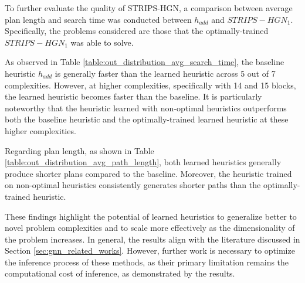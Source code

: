 

To further evaluate the quality of STRIPS-HGN, a comparison between average plan length and search time was conducted between $h_{add}$ and $STRIPS-HGN_{1}$. Specifically, the problems considered are those that the optimally-trained \\ $STRIPS-HGN_{1}$ was able to solve.




As observed in Table \ref{table:out_distribution_avg_search_time}, the baseline heuristic $h_{add}$ is generally faster than the learned heuristic across 5 out of 7 complexities. However, at higher complexities, specifically with 14 and 15 blocks, the learned heuristic becomes faster than the baseline. It is particularly noteworthy that the heuristic learned with non-optimal heuristics outperforms both the baseline heuristic and the optimally-trained learned heuristic at these higher complexities.

Regarding plan length, as shown in Table \ref{table:out_distribution_avg_path_length}, both learned heuristics generally produce shorter plans compared to the baseline. Moreover, the heuristic trained on non-optimal heuristics consistently generates shorter paths than the optimally-trained heuristic.

These findings highlight the potential of learned heuristics to generalize better to novel problem complexities and to scale more effectively as the dimensionality of the problem increases. In general, the results align with the literature discussed in Section \ref{sec:gnn_related_works}. However, further work is necessary to optimize the inference process of these methods, as their primary limitation remains the computational cost of inference, as demonstrated by the results.
